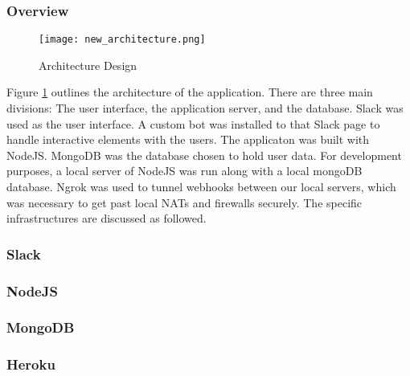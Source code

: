 \subsubsection{Overview}
\begin{figure}[ht]
\caption{Architecture Design}
\centering
	\label{arch-pic}
	\texttt{[image: new\_architecture.png]}
\end{figure}

Figure \ref{arch-pic} outlines the architecture of the application.
There are three main divisions: The user interface, the application server, and the database. 
Slack was used as the user interface. A custom bot was installed to that Slack page to handle 
interactive elements with the users. The applicaton was built with NodeJS. MongoDB was the 
database chosen to hold user data. For development purposes, a local server of NodeJS was run 
along with a local mongoDB database. Ngrok was used to tunnel webhooks between our local servers, 
which was necessary to get past local NATs and firewalls securely. The specific infrastructures are discussed as followed.


\subsubsection{Slack}
\label{sec:slack}


\subsubsection{NodeJS}
\label{sec:nodejs}


\subsubsection{MongoDB}
\label{sec:mongo}


\subsubsection{Heroku}
\label{sec:heroku}







